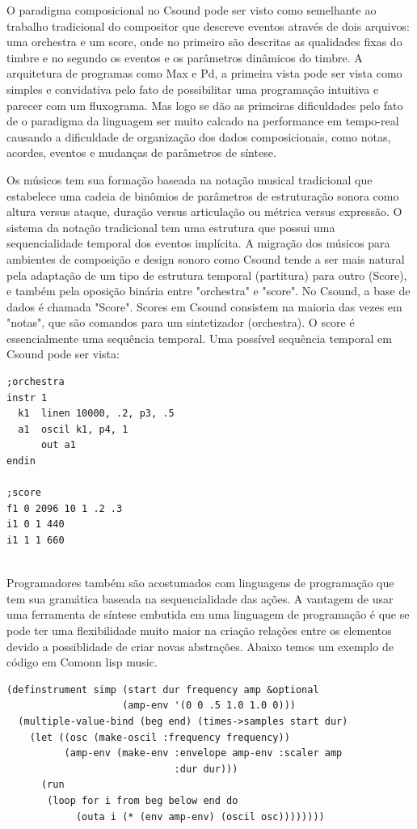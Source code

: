 \documentclass[12pt]{article}
\begin{document}
O paradigma composicional no Csound pode ser visto como semelhante ao 
trabalho tradicional do compositor que descreve eventos através de dois arquivos:
uma orchestra e um score, onde no primeiro são descritas as qualidades fixas do 
timbre e no segundo os eventos e os parâmetros dinâmicos do timbre. A arquitetura
de programas como Max e Pd, a primeira vista pode ser vista como simples e 
convidativa pelo fato de possibilitar uma programação intuitiva e parecer com 
um fluxograma. Mas logo se dão as primeiras dificuldades pelo fato de o paradigma 
da linguagem ser muito calcado na performance em tempo-real causando a
dificuldade de organização dos dados composicionais, como notas, acordes, eventos e
mudanças de parâmetros de síntese.

Os músicos tem sua formação baseada na notação musical tradicional que
estabelece uma cadeia de binômios de parâmetros de estruturação sonora\cite
{zampronha00:notacao} como altura
versus ataque, duração versus articulação ou métrica versus expressão. 
O sistema da notação tradicional tem uma
estrutura que possui uma sequencialidade temporal dos eventos
implícita. A migração dos músicos para ambientes de composição e
design sonoro como Csound \cite{boulanger00:csound} tende a ser mais natural pela
adaptação de um tipo de estrutura temporal (partitura) para outro
(Score), e também pela oposição binária entre "orchestra" e "score". No
Csound, a base de dados é chamada "Score". Scores em Csound consistem
na maioria das vezes em "notas", que são comandos para um sintetizador
(orchestra). O score é essencialmente uma sequência temporal. Uma possível
sequência temporal em Csound pode ser vista:

\begin{verbatim}
;orchestra
instr 1
  k1  linen 10000, .2, p3, .5
  a1  oscil k1, p4, 1
      out a1
endin

;score
f1 0 2096 10 1 .2 .3
i1 0 1 440
i1 1 1 660


\end{verbatim}

Programadores também são acostumados com linguagens de programação que
tem sua gramática baseada na sequencialidade das ações. A vantagem de
usar uma ferramenta de síntese embutida em uma linguagem de
programação é que se pode ter uma flexibilidade muito maior na criação
relações entre os elementos devido a possiblidade de criar novas
abstrações. Abaixo temos um exemplo de código em Comonn lisp music.



\begin{verbatim}
(definstrument simp (start dur frequency amp &optional
                    (amp-env '(0 0 .5 1.0 1.0 0)))
  (multiple-value-bind (beg end) (times->samples start dur)
    (let ((osc (make-oscil :frequency frequency))
          (amp-env (make-env :envelope amp-env :scaler amp
                             :dur dur)))
      (run 
       (loop for i from beg below end do
            (outa i (* (env amp-env) (oscil osc))))))))
\end{verbatim}
\end{document}
